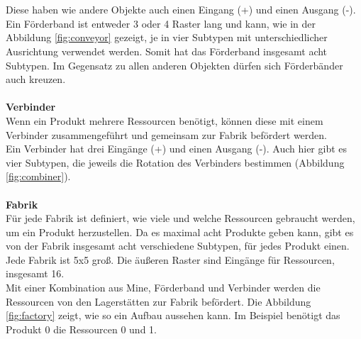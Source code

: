 \\\\
Diese haben wie andere Objekte auch einen Eingang (+) und einen Ausgang (-). Ein Förderband ist entweder 3 oder 4 Raster lang und kann, wie in der Abbildung \ref{fig:conveyor} gezeigt, je in vier Subtypen mit unterschiedlicher Ausrichtung verwendet werden. Somit hat das Förderband insgesamt acht Subtypen.
Im Gegensatz zu allen anderen Objekten dürfen sich Förderbänder auch kreuzen.
\\\\
\textbf{Verbinder}\\
Wenn ein Produkt mehrere Ressourcen benötigt, können diese mit einem Verbinder zusammengeführt und gemeinsam zur Fabrik befördert werden. 
\\
Ein Verbinder hat drei Eingänge (+) und einen Ausgang (-). Auch hier gibt es vier Subtypen, die jeweils die Rotation des Verbinders bestimmen (Abbildung \ref{fig:combiner}).
\\\\
\textbf{Fabrik}\\
Für jede Fabrik ist definiert, wie viele und welche Ressourcen gebraucht werden, um ein Produkt herzustellen. Da es maximal acht Produkte geben kann, gibt es von der Fabrik insgesamt acht verschiedene Subtypen, für jedes Produkt einen. Jede Fabrik ist 5x5 groß. Die äußeren Raster sind Eingänge für Ressourcen, insgesamt 16.
\\
Mit einer Kombination aus Mine, Förderband und Verbinder werden die Ressourcen von den Lagerstätten zur Fabrik befördert. Die Abbildung \ref{fig:factory} zeigt, wie so ein Aufbau aussehen kann. Im Beispiel benötigt das Produkt 0 die Ressourcen 0 und 1.


